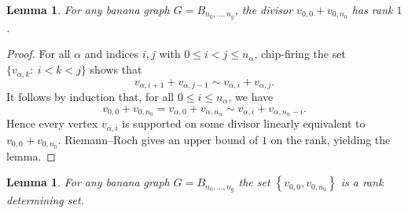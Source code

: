 \documentclass[11pt]{article}
\newtheorem{lemma}[theo]{Lemma}
\theoremstyle{definition}
\numberwithin{equation}{section}
\newcommand{\set}[1]{\left\{{#1}\right\}}
\begin{document}
\begin{lemma}\label{lem:g12}
For any banana graph $G= B_{n_0,\dots,n_g}$, the divisor $v_{0,0} + v_{0,n_0}$ has rank $1$.
\end{lemma}

\begin{proof}
For all $\alpha$ and indices $i,j$ with $0 \leq i < j \leq n_\alpha$, chip-firing the set $\{v_{\alpha,k}:\ i <  k < j \}$  shows that 
$$v_{\alpha,i+1} + v_{\alpha,j-1} \sim v_{\alpha,i} + v_{\alpha,j}.$$
It follows by induction that, for all $0 \leq i \leq n_\alpha$, we have
$$v_{0,0} + v_{0,n_0} = v_{\alpha,0} + v_{\alpha,n_\alpha} \sim v_{\alpha,i} + v_{\alpha,n_\alpha-i}.$$
Hence every vertex $v_{\alpha,i}$ is supported on some divisor linearly equivalent to $v_{0,0} + v_{0,n_0}$. Riemann--Roch \cite[Theorem 1.12]{BakNor07} gives an upper bound of $1$ on the rank, yielding the lemma.
\end{proof}

\begin{lemma}\label{lem-BananaRDS}
    For any banana graph $G= B_{n_0,\dots,n_g}$ the set $\set{v_{0,0},v_{0,n_0}}$ is a rank determining set.
\end{lemma}
\end{document}
